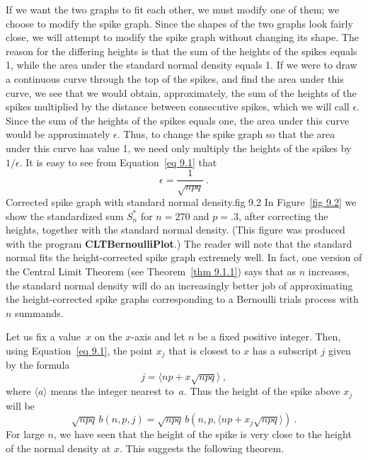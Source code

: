 \par
If we want the two graphs to fit each other, we must modify one of them; we choose to modify the
spike graph.   Since the shapes of the two graphs look fairly close, we will attempt to modify the
spike graph without changing its shape.  The reason for the differing heights is that the sum of
the heights of the spikes equals 1, while the area under the standard normal density equals 1. 
If we were to draw a continuous curve through the top of the spikes, and find the area under this
curve, we see that we would obtain, approximately, the sum of the heights of the spikes multiplied
by the distance between consecutive spikes, which we will call $\epsilon$.  Since the sum of the
heights of the spikes equals one, the area under this curve would be approximately $\epsilon$. 
Thus, to change the spike graph so that the area under this curve has value 1, we need only
multiply the heights of the spikes by $1/\epsilon$.  It is easy to see from Equation~\ref{eq 9.1}
that 
$$\epsilon = \frac {1}{\sqrt {npq}}\ .$$ 
{Corrected spike graph with standard normal density.}{fig 9.2} 
In Figure~\ref{fig 9.2} we show the standardized sum $S^*_n$ for $n = 270$ and $p = .3$, 
after correcting the heights, together with the standard normal density.  (This figure
was produced with the program {\bf CLTBernoulliPlot}.)  The
reader will note that the standard normal fits the height-corrected spike graph extremely well. 
In fact, one version of the Central Limit Theorem (see Theorem~\ref{thm 9.1.1}) says that as $n$
increases, the standard normal density will do an increasingly better job of approximating the
height-corrected spike graphs corresponding to a Bernoulli trials process with $n$ summands. 
\par
Let us fix a value~$x$ on the $x$-axis and let $n$ be a fixed positive integer.  Then, using
Equation~\ref{eq 9.1}, the point $x_j$ that is closest to $x$ has a subscript $j$ given by the
formula
$$
j = \langle np + x \sqrt{npq} \rangle\ ,
$$
where $\langle a \rangle$ means the integer nearest to~$a$.  
Thus the height
of the spike above $x_j$ will be
$$
\sqrt{npq}\,b(n,p,j) = \sqrt{npq}\,b(n,p,\langle np + x_j \sqrt{npq}
\rangle)\ .
$$
For large $n$, we have seen that the height of the spike is very close to the height
of the normal density at $x$.  This suggests the following theorem.

